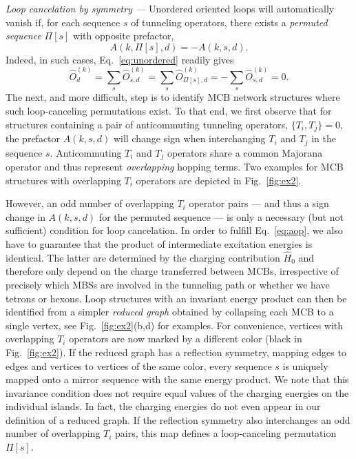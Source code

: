 \documentclass[twocolumn,floats,prx,showpacs]{revtex4-1}
\newcommand{\alex}[1]{{\color{alex} #1}}
\begin{document}
\emph{Loop cancelation by symmetry ---}
Unordered oriented loops will automatically vanish if, for each sequence $s$ of tunneling operators, there exists a \emph{permuted sequence} $\Pi[s]$ with opposite prefactor, 
\begin{equation}\label{eq:aop}
A(k, \Pi[s],d) = -A(k,s,d).
\end{equation}
Indeed, in such  cases, Eq.~\eqref{eq:unordered} readily gives  
\begin{equation}
\hat O^{(k)}_d=\sum_{s} \hat O^{(k)}_{s,d}  = 
\sum_{s} \hat O^{(k)}_{\Pi[s],d} = - \sum_{s} \hat O^{(k)}_{s,d} = 0.
\end{equation} 
The next, and more difficult, step is to identify MCB network structures where such loop-canceling permutations exist. To that end, we first observe that for structures containing a pair of anticommuting tunneling operators, $\{ T_i, T_j\}=0$, the prefactor $A(k,s,d)$ will change sign when interchanging $T_i$ and $T_j$ in the sequence $s$.   
Anticommuting $T_i$ and $T_j$ operators share a common Majorana operator and thus represent \emph{overlapping} hopping terms. Two examples for MCB structures with overlapping $T_i$ operators are depicted in Fig.~\ref{fig:ex2}. 

However, an odd number of overlapping $T_i$ operator pairs --- and thus a sign change in $A(k,s,d)$ for the 
permuted sequence --- is only a necessary (but not sufficient) condition for loop cancelation.  
In order to fulfill Eq.~\eqref{eq:aop}, we also have to guarantee that the product of intermediate excitation
energies is identical.  The latter are determined by the charging contribution $\hat H_0$
and therefore only depend on the charge transferred between MCBs, irrespective of precisely which 
MBSs are involved in the tunneling path or whether we have tetrons or hexons. 
Loop structures with an invariant energy product can then be identified 
from a simpler \emph{reduced graph} obtained by collapsing each MCB to a single vertex, 
see Fig.~\ref{fig:ex2}(b,d) for examples.
For convenience, vertices with overlapping $T_i$ operators are now marked by a different color (black in Fig.~\ref{fig:ex2}). If the reduced graph has a reflection symmetry, 
mapping edges to edges and vertices to vertices of the same color, 
every sequence $s$ is uniquely mapped onto a mirror sequence with the same energy product. \alex{We note that this invariance condition does not require equal values of the charging energies on the individual islands. In fact, the charging energies do not even appear in our definition of a reduced graph.  }
If the reflection symmetry also interchanges an odd number of overlapping $T_i$ pairs,
this map defines a loop-canceling permutation $\Pi[s]$. 
\end{document}
